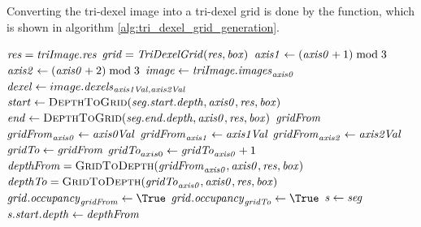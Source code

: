 Converting the tri-dexel image into a tri-dexel grid is done by the  function, which is shown in algorithm \ref{alg:tri_dexel_grid_generation}.
%
\begin{algorithm}
	\centering
	\begin{algorithmic}[1]
			\State $\mathit{res} = \mathit{triImage}.\mathit{res}$
			\State $\mathit{grid} = \mathit{TriDexelGrid}(\mathit{res}, \mathit{box})$ 
				\State $\mathit{axis1} \gets (\mathit{axis0} + 1) \bmod 3$
				\State $\mathit{axis2} \gets (\mathit{axis0} + 2) \bmod 3$
				\State $\mathit{image} \gets \mathit{triImage.images}_{\mathit{axis0}}$
						\State $\mathit{dexel} \gets image.\mathit{dexels}_{\mathit{axis1Val}, \mathit{axis2Val}}$
							\State $\var{start} \gets \Call{DepthToGrid}{\var{seg}.\var{start}.\var{depth}, \var{axis0}, \var{res}, \var{box}}$
							\State $\var{end} \gets \Call{DepthToGrid}{\var{seg}.\var{end}.\var{depth}, \var{axis0}, \var{res}, \var{box}}$
								\State $\mathit{gridFrom}$
								\State $\mathit{gridFrom}_{\mathit{axis0}} \gets \mathit{axis0Val}$
								\State $\mathit{gridFrom}_{\mathit{axis1}} \gets \mathit{axis1Val}$
								\State $\mathit{gridFrom}_{\mathit{axis2}} \gets \mathit{axis2Val}$
								\State $\mathit{gridTo} \gets \mathit{gridFrom}$
								\State $\mathit{gridTo}_{axis0} \gets \mathit{gridTo}_{\mathit{axis0}} + 1$
								\State $\var{depthFrom} = \Call{GridToDepth}{\var{gridFrom}_{\var{axis0}}, \var{axis0}, \var{res}, \var{box}}$
								\State $\var{depthTo}   = \Call{GridToDepth}{\var{gridTo}_{\var{axis0}}, \var{axis0}, \var{res}, \var{box}}$
									\State $\var{grid}.\var{occupancy}_{\var{gridFrom}} \gets \True$
								\EndIf
									\State $\var{grid}.\var{occupancy}_{\var{gridTo}} \gets \True$
								\EndIf
								\State $\mathit{s} \gets \mathit{seg}$
									\State $\mathit{s}.\mathit{start}.\mathit{depth} \gets \mathit{depthFrom}$

\end{algorithmic}
\end{algorithm}
